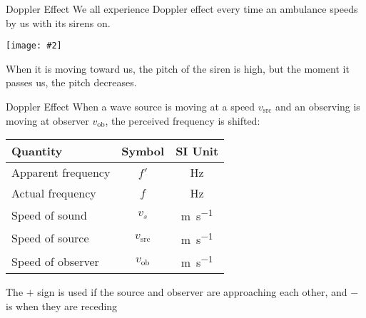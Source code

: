 \documentclass[12pt,aspectratio=169]{beamer}
\newcommand{\pic}[2]{\texttt{[image: \#2]}}
\newcommand{\eq}[2]{\vspace{#1}{\Large\begin{displaymath}#2\end{displaymath}}}
\begin{document}
\begin{frame}{Doppler Effect}
  We all experience Doppler effect every time an ambulance speeds by us with
  its sirens on.
  \begin{center}
    \pic{.6}{toronto-ambulance}
  \end{center}
  When it is moving toward us, the pitch of the siren is high, but the moment
  it passes us, the pitch decreases.
\end{frame}



\begin{frame}{Doppler Effect}
  When a wave source is moving at a speed $v_\text{src}$ and an observing is
  moving at observer $v_\text{ob}$, the perceived frequency is shifted:

  \eq{-.2in}{
    \boxed{f'=\frac{v_s\pm v_\text{ob}}{v_s\mp v_\text{src}}f}
  }
  \begin{center}
    \begin{tabular}{l|c|c}
      \rowcolor{pink}
      \textbf{Quantity} & \textbf{Symbol} & \textbf{SI Unit} \\ \hline
      Apparent frequency  & $f'$   & \si\hertz \\
      Actual frequency    & $f$    & \si\hertz \\
      Speed of sound      & $v_s$ & \si{\metre\per\second}\\
      Speed of source & $v_\text{src}$ & \si{\metre\per\second}\\
      Speed of observer & $v_\text{ob}$ & \si{\metre\per\second}
    \end{tabular}
  \end{center}
  The $+$ sign is used if the source and observer are approaching each other,
  and $-$ is when they are receding
\end{frame}
\end{document}
